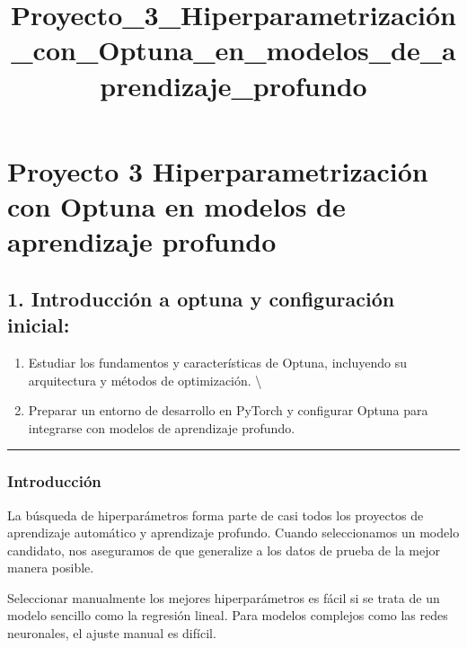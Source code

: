 \documentclass[11pt]{article}
\title{Proyecto\_3\_Hiperparametrización\_con\_Optuna\_en\_modelos\_de\_aprendizaje\_profundo}
\providecommand{\tightlist}{%
      \setlength{\itemsep}{0pt}\setlength{\parskip}{0pt}}
\begin{document}
    
    \maketitle
    
    

    
    \hypertarget{proyecto-3-hiperparametrizaciuxf3n-con-optuna-en-modelos-de-aprendizaje-profundo}{%
\section{Proyecto 3 Hiperparametrización con Optuna en modelos de
aprendizaje
profundo}\label{proyecto-3-hiperparametrizaciuxf3n-con-optuna-en-modelos-de-aprendizaje-profundo}}

    \hypertarget{introducciuxf3n-a-optuna-y-configuraciuxf3n-inicial}{%
\subsection{1. Introducción a optuna y configuración
inicial:}\label{introducciuxf3n-a-optuna-y-configuraciuxf3n-inicial}}

    \begin{enumerate}
\def\labelenumi{\alph{enumi}.}
\tightlist
\item
  Estudiar los fundamentos y características de Optuna, incluyendo su
  arquitectura y métodos de optimización. \textbackslash{}
\item
  Preparar un entorno de desarrollo en PyTorch y configurar Optuna para
  integrarse con modelos de aprendizaje profundo.
\end{enumerate}

    \begin{center}\rule{0.5\linewidth}{0.5pt}\end{center}

    \hypertarget{introducciuxf3n}{%
\subsubsection{Introducción}\label{introducciuxf3n}}

    La búsqueda de hiperparámetros forma parte de casi todos los proyectos
de aprendizaje automático y aprendizaje profundo. Cuando seleccionamos
un modelo candidato, nos aseguramos de que generalize a los datos de
prueba de la mejor manera posible.

Seleccionar manualmente los mejores hiperparámetros es fácil si se trata
de un modelo sencillo como la regresión lineal. Para modelos complejos
como las redes neuronales, el ajuste manual es difícil.
\end{document}
